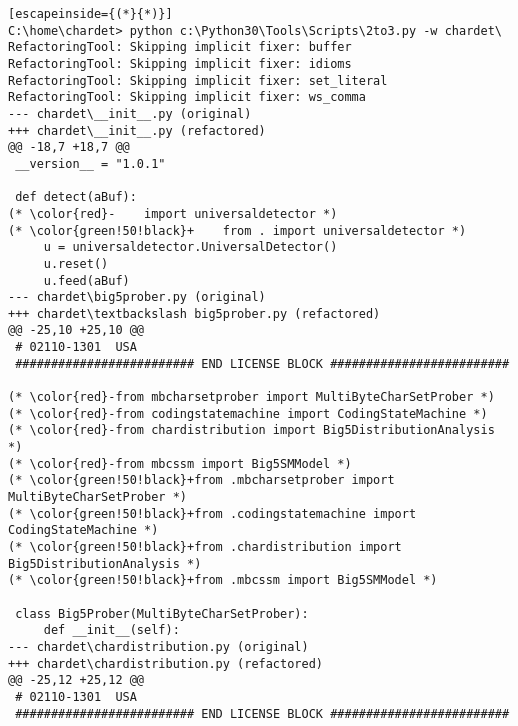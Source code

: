 \begin{lstlisting}[escapeinside={(*}{*)}]
C:\home\chardet> python c:\Python30\Tools\Scripts\2to3.py -w chardet\
RefactoringTool: Skipping implicit fixer: buffer
RefactoringTool: Skipping implicit fixer: idioms
RefactoringTool: Skipping implicit fixer: set_literal
RefactoringTool: Skipping implicit fixer: ws_comma
--- chardet\__init__.py (original)
+++ chardet\__init__.py (refactored)
@@ -18,7 +18,7 @@
 __version__ = "1.0.1"

 def detect(aBuf):
(* \color{red}-    import universaldetector *)
(* \color{green!50!black}+    from . import universaldetector *)
     u = universaldetector.UniversalDetector()
     u.reset()
     u.feed(aBuf)
--- chardet\big5prober.py (original)
+++ chardet\textbackslash big5prober.py (refactored)
@@ -25,10 +25,10 @@
 # 02110-1301  USA
 ######################### END LICENSE BLOCK #########################

(* \color{red}-from mbcharsetprober import MultiByteCharSetProber *)
(* \color{red}-from codingstatemachine import CodingStateMachine *)
(* \color{red}-from chardistribution import Big5DistributionAnalysis *)
(* \color{red}-from mbcssm import Big5SMModel *)
(* \color{green!50!black}+from .mbcharsetprober import MultiByteCharSetProber *)
(* \color{green!50!black}+from .codingstatemachine import CodingStateMachine *)
(* \color{green!50!black}+from .chardistribution import Big5DistributionAnalysis *)
(* \color{green!50!black}+from .mbcssm import Big5SMModel *)

 class Big5Prober(MultiByteCharSetProber):
     def __init__(self):
--- chardet\chardistribution.py (original)
+++ chardet\chardistribution.py (refactored)
@@ -25,12 +25,12 @@
 # 02110-1301  USA
 ######################### END LICENSE BLOCK #########################


\end{lstlisting}
